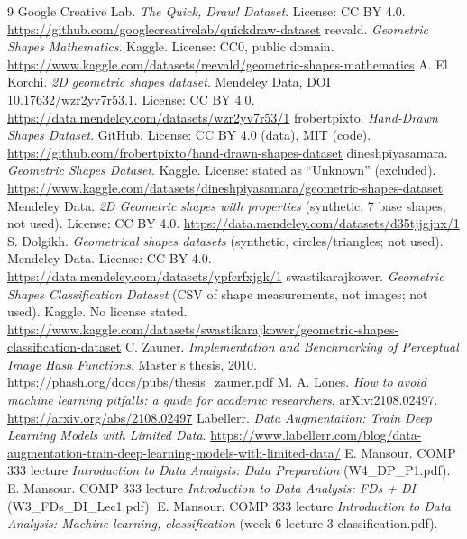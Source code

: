 \documentclass[11pt]{article}
\begin{document}
\newpage
\begin{thebibliography}{9}
 Google Creative Lab. \emph{The Quick, Draw! Dataset}.
  License: CC BY 4.0.
  \url{https://github.com/googlecreativelab/quickdraw-dataset}
 reevald. \emph{Geometric Shapes Mathematics}.
  Kaggle. License: CC0, public domain.
  \url{https://www.kaggle.com/datasets/reevald/geometric-shapes-mathematics}
 A. El Korchi. \emph{2D geometric shapes dataset}.
  Mendeley Data, DOI 10.17632/wzr2yv7r53.1. License: CC BY 4.0.
  \url{https://data.mendeley.com/datasets/wzr2yv7r53/1}
 frobertpixto. \emph{Hand-Drawn Shapes Dataset}.
  GitHub. License: CC BY 4.0 (data), MIT (code).
  \url{https://github.com/frobertpixto/hand-drawn-shapes-dataset}
 dineshpiyasamara. \emph{Geometric Shapes Dataset}.
  Kaggle. License: stated as ``Unknown'' (excluded).
  \url{https://www.kaggle.com/datasets/dineshpiyasamara/geometric-shapes-dataset}
 Mendeley Data. \emph{2D Geometric shapes with
  properties} (synthetic, 7 base shapes; not used). License: CC BY 4.0.
  \url{https://data.mendeley.com/datasets/d35tjjgjnx/1}
 S. Dolgikh. \emph{Geometrical shapes datasets}
  (synthetic, circles/triangles; not used). Mendeley Data. License:
  CC BY 4.0.
  \url{https://data.mendeley.com/datasets/ypfcrfxjgk/1}
 swastikarajkower. \emph{Geometric Shapes
  Classification Dataset} (CSV of shape measurements, not images; not
  used). Kaggle. No license stated.
  \url{https://www.kaggle.com/datasets/swastikarajkower/geometric-shapes-classification-dataset}
 C. Zauner. \emph{Implementation and Benchmarking of
  Perceptual Image Hash Functions}. Master's thesis, 2010.
  \url{https://phash.org/docs/pubs/thesis_zauner.pdf}
 M. A. Lones. \emph{How to avoid machine learning
  pitfalls: a guide for academic researchers}. arXiv:2108.02497.
  \url{https://arxiv.org/abs/2108.02497}
 Labellerr. \emph{Data Augmentation: Train Deep
  Learning Models with Limited Data}.
  \url{https://www.labellerr.com/blog/data-augmentation-train-deep-learning-models-with-limited-data/}
 E. Mansour. COMP 333 lecture \emph{Introduction to Data
  Analysis: Data Preparation} (W4\_DP\_P1.pdf).
 E. Mansour. COMP 333 lecture \emph{Introduction to Data
  Analysis: FDs + DI} (W3\_FDs\_DI\_Lec1.pdf).
 E. Mansour. COMP 333 lecture \emph{Introduction to Data
  Analysis: Machine learning, classification}
  (week-6-lecture-3-classification.pdf).
\end{thebibliography}
\end{document}
